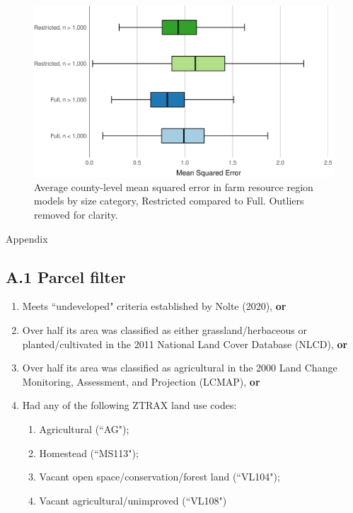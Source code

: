 \documentclass[12pt]{article}
\begin{document}
\begin{figure}[H]
    \centering
    \includegraphics[width=1\textwidth]{exhibits/frr_compare_mse_size.png}
    \caption{Average county-level mean squared error in farm resource region models by size category, Restricted compared to Full. Outliers removed for clarity.}
    \label{fig:frr_compare_mse_size}
\end{figure}



\newpage
\newpage

\vspace*{200pt}

\begin{huge}
    \begin{center}
        Appendix
    \end{center}
\end{huge}

\newpage

\subsection*{A.1 Parcel filter}

\begin{enumerate}
    \item Meets ``undeveloped" criteria established by Nolte (2020), \textbf{or}
    \item Over half its area was classified as either grassland/herbaceous or planted/cultivated in the 2011 National Land Cover Database (NLCD), \textbf{or}
    \item Over half its area was classified as agricultural in the 2000 Land Change Monitoring, Assessment, and Projection (LCMAP), \textbf{or}
    \item Had any of the following ZTRAX land use codes:
    \begin{enumerate}
        \item Agricultural (``AG");
        \item Homestead (``MS113");
        \item Vacant open space/conservation/forest land (``VL104");
        \item Vacant agricultural/unimproved (``VL108")
    \end{enumerate}
\end{enumerate}
\end{document}
